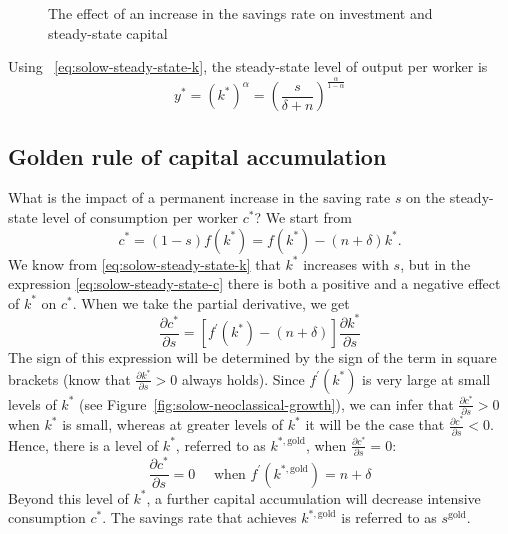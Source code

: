 \documentclass[\topdir/lecture\_notes.tex]{subfiles}
\begin{document}
\begin{figure}[h]
\begin{center}
  \caption{The effect of an increase in the savings rate on investment and steady-state capital}
  \label{fig:solow-investment-shift}
\end{center}
\end{figure}

Using ~\ref{eq:solow-steady-state-k}, the steady-state level of output per worker is
\begin{equation}
y^{*}=\left(k^{*}\right)^{\alpha}=\left(\frac{s}{\delta+n}\right)^{\frac{\alpha}{1-\alpha}}
\label{eq:solow-steady-state-y}
\end{equation}

\subsection{Golden rule of capital accumulation}
What is the impact of a permanent increase in the saving rate $s$ on the steady-state level of consumption per worker $c^{*}$? We start from
\begin{equation}
  c^{*}=(1-s) f\left(k^{*}\right)=f\left(k^{*}\right)-(n+\delta) k^{*}. \label{eq:solow-steady-state-c}
\end{equation}
We know from \eqref{eq:solow-steady-state-k} that $k^{*}$ increases with $s$, but in the expression \eqref{eq:solow-steady-state-c} there is both a positive and a negative effect of $k^{*}$ on $c^{*}$.
When we take the partial derivative, we get
\begin{equation}
  \frac{\partial c^{*}}{\partial s}=\left[f^{\prime}\left(k^{*}\right)-(n+\delta)\right] \frac{\partial k^{*}}{\partial s} \label{eq:solow-c-derivative}
\end{equation}
The sign of this expression will be determined by the sign of the term in square brackets (know that $\frac{\partial k^{*}}{\partial s}>0$ always holds).
Since $f^{\prime}\left(k^{*}\right)$ is very large at small levels of $k^{*}$ (see Figure~\ref{fig:solow-neoclassical-growth}), we can infer that $\frac{\partial c^{*}}{\partial s}>0$ when $k^{*}$ is small, whereas at greater levels of $k^{*}$ it will be the case that $\frac{\partial c^{*}}{\partial s}<0$.
Hence, there is a level of $k^{*}$, referred to as $k^{*, \text{gold}}$, when $\frac{\partial c^{*}}{\partial s}=0$:
\begin{equation}
  \frac{\partial c^{*}}{\partial s}=0 \quad \text { when } f^{\prime}\left(k^{*, \text{gold}}\right)=n+\delta
  \label{eq:solow-golden-rule}
\end{equation}
Beyond this level of $k^{*}$, a further capital accumulation will decrease intensive consumption $c^{*}$.
The savings rate that achieves $k^{*, \text{gold}}$ is referred to as $s^{\text{gold}}$.
\end{document}
